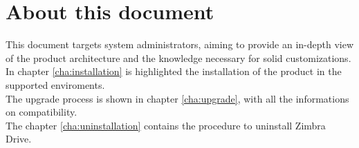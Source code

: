 \section{About this document}
This document targets system administrators, aiming to provide an in-depth view of the product architecture
and the knowledge necessary for solid customizations.\\
In chapter \ref{cha:installation} is highlighted the installation of the product in the supported enviroments.\\
The upgrade process is shown in chapter \ref{cha:upgrade}, with all the informations on compatibility.\\
The chapter \ref{cha:uninstallation} contains the procedure to uninstall Zimbra Drive.